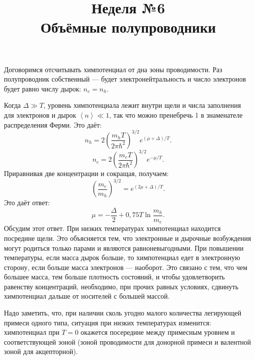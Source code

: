 \documentclass[a4paper]{article}
\title{Неделя №6\\
Объёмные полупроводники}
\begin{document}
	\maketitle
\begin{hiProb}[4.7]
\end{hiProb}
\begin{sol}
Договоримся отсчитывать химпотенциал от дна зоны
проводимости. Раз полупроводник собственный ---
будет электронейтральность и число электронов
будет равно числу дырок: $n_e=n_h$.

Когда  $\Delta \gg T$, уровень химпотенциала
лежит внутри щели и числа заполнения для
электронов и дырок $\left<n \right> \ll 1$, так
что можно пренебречь 1 в знаменателе распределения
Ферми. Это даёт:
\[
	n_h= 2 \left( \frac{m_h T}{2\pi \hbar ^2} \right) ^{3 /2} e^{(\mu +\Delta) /T}
.\] 
\[
	n_e =2 \left( \frac{m_e T}{2\pi \hbar ^2} \right) ^{3/2} e^{-\mu /T}
.\] 
Приравнивая две концентрации и сокращая, получаем:
\[
	\left( \frac{m_e}{m_h} \right) ^{3/2}
	=e^{(2\mu +\Delta) /T}
.\] 
Это даёт ответ:
\[
\mu=-\frac{\Delta}{2} +0,75 T \ln \frac{m_h}{m_e}
.\] 
Обсудим этот ответ. При низких температурах химпотенциал находится посредине щели. Это объясняется тем,
что электронные и дырочные возбуждения могут родиться
только парами и являются равноневыгодными. При
повышении температуры, если масса дырок больше,
то химпотенциал едет в электронную сторону,
если больше масса электронов --- наоборот. Это
связано с тем, что чем большее масса, тем больше
плотность состояний, и чтобы удовлетворить
равенству концентраций, необходимо, при прочих
равных условиях, сдвинуть химпотенциал дальше
от носителей с большей массой.

Надо заметить, что, при наличии сколь угодно
малого количества легирующей примеси
одного типа, ситуация при низких температурах изменится: химпотенциал при $T=0$ окажется посередине
между примесным уровнем и соответствующей зоной
(зоной проводимости для донорной примеси и валентной
зоной для акцепторной).
\end{sol}
\begin{hiProb}[Т6-1]
\end{hiProb}
\end{document}
